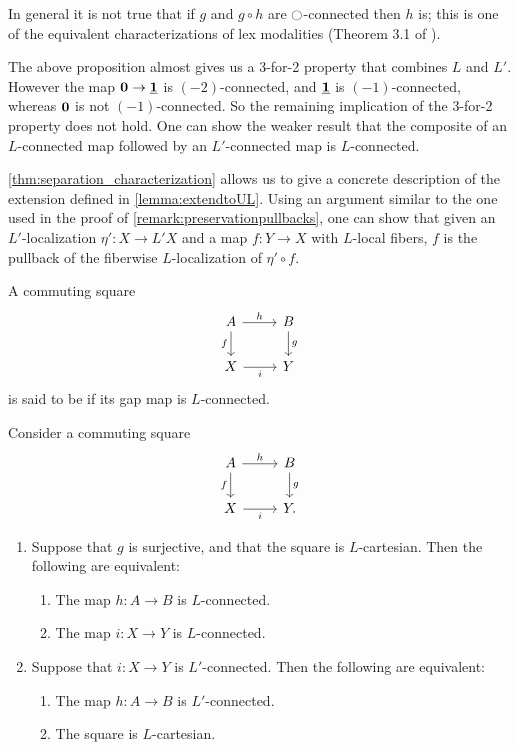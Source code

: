 \begin{rmk}
In general it is not true that if $g$ and $g\circ h$ are ${\ocircle}$-connected then $h$ is; this is one of the equivalent characterizations of lex modalities (Theorem 3.1 of \cite{RijkeShulmanSpitters}).

The above proposition almost gives us a 3-for-2 property that combines $L$ and $L'$.
However the map $\mathbf{0} \to \underline{\mathbf{1}}$ is $(-2)$-connected, and $\underline{\mathbf{1}}$ is $(-1)$-connected,
whereas $\mathbf{0}$ is not $(-1)$-connected. So the remaining implication of the 3-for-2 property
does not hold. One can show the weaker result that the composite of an $L$-connected map followed by
an $L'$-connected map is $L$-connected.
\end{rmk}

\begin{rmk}
\cref{thm:separation_characterization} allows us to give a concrete description of
the extension defined in \cref{lemma:extendtoUL}.
Using an argument similar to the one used in the proof of \cref{remark:preservationpullbacks},
one can show that given an $L'$-localization $\eta' : X \to L' X$
and a map $f: Y \to X$ with $L$-local fibers, $f$ is the pullback of
the fiberwise $L$-localization of $\eta' \circ f$.
\end{rmk}

\begin{defn}
A commuting square
\begin{equation*}
\begin{tikzcd}
A\arrow[d,swap,"f"] \arrow[r,"h"] & B \arrow[d,"g"] \\
X \arrow[r,swap,"i"] & Y
\end{tikzcd}
\end{equation*}
is said to be  if its gap map is $L$-connected.
\end{defn}

\begin{prp}
Consider a commuting square
\begin{equation*}
\begin{tikzcd}
A\arrow[d,swap,"f"] \arrow[r,"h"] & B \arrow[d,"g"] \\
X \arrow[r,swap,"i"] & Y.
\end{tikzcd}
\end{equation*}
\begin{enumerate}
\item Suppose that $g$ is surjective, and that the square is $L$-cartesian. Then the following are equivalent:
\begin{enumerate}
\item The map $h:A\to B$ is $L$-connected.
\item The map $i:X\to Y$ is $L$-connected.
\end{enumerate}
\item Suppose that $i:X\to Y$ is $L'$-connected. Then the following are equivalent:
\begin{enumerate}
\item The map $h:A\to B$ is $L'$-connected.
\item The square is $L$-cartesian.
\end{enumerate}
\end{enumerate}
\end{prp}

